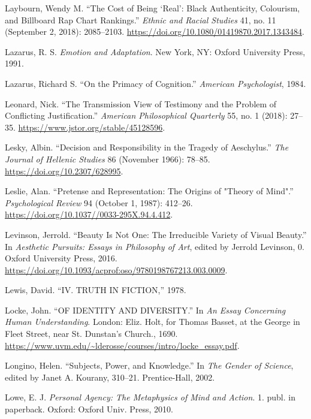 \documentclass[phdthesis,12pt,final]{wuthesis}
\newlength{\cslhangindent}
\newenvironment{CSLReferences}[2] %
{\begin{list}{}{%
	\setlength{\itemindent}{0pt}
	\setlength{\leftmargin}{0pt}
	\setlength{\parsep}{0pt}
	\ifodd #1
	\setlength{\leftmargin}{\cslhangindent}
	\setlength{\itemindent}{-1\cslhangindent}
	\fi
	\setlength{\itemsep}{#2\baselineskip}}}
{\end{list}}
\theoremstyle{definition}
\theoremstyle{definition}
\theoremstyle{definition}
\theoremstyle{definition}
\theoremstyle{remark}
\begin{document}
\begin{CSLReferences}{1}{0}
Laybourn, Wendy M. {``The Cost of Being {`Real'}: Black Authenticity, Colourism, and {Billboard Rap Chart} Rankings.''} \emph{Ethnic and Racial Studies} 41, no. 11 (September 2, 2018): 2085--2103. \url{https://doi.org/10.1080/01419870.2017.1343484}.

Lazarus, R. S. \emph{Emotion and Adaptation}. New York, NY: Oxford University Press, 1991.

Lazarus, Richard S. {``On the {Primacy} of {Cognition}.''} \emph{American Psychologist}, 1984.

Leonard, Nick. {``The {Transmission View} of {Testimony} and the {Problem} of {Conflicting Justification}.''} \emph{American Philosophical Quarterly} 55, no. 1 (2018): 27--35. \url{https://www.jstor.org/stable/45128596}.

Lesky, Albin. {``Decision and {Responsibility} in the {Tragedy} of {Aeschylus}.''} \emph{The Journal of Hellenic Studies} 86 (November 1966): 78--85. \url{https://doi.org/10.2307/628995}.

Leslie, Alan. {``Pretense and {Representation}: {The Origins} of "{Theory} of {Mind}".''} \emph{Psychological Review} 94 (October 1, 1987): 412--26. \url{https://doi.org/10.1037//0033-295X.94.4.412}.

Levinson, Jerrold. {``Beauty Is {Not One}: {The Irreducible Variety} of {Visual Beauty}.''} In \emph{Aesthetic {Pursuits}: {Essays} in {Philosophy} of {Art}}, edited by Jerrold Levinson, 0. Oxford University Press, 2016. \url{https://doi.org/10.1093/acprof:oso/9780198767213.003.0009}.

Lewis, David. {``{IV}. {TRUTH IN FICTION},''} 1978.

Locke, John. {``{OF IDENTITY AND DIVERSITY}.''} In \emph{An {Essay Concerning Human Understanding}}. London: Eliz. Holt, for Thomas Basset, at the George in Fleet Street, near St. Dunstan's Church., 1690. \url{https://www.uvm.edu/~lderosse/courses/intro/locke_essay.pdf}.

Longino, Helen. {``Subjects, {Power}, and {Knowledge}.''} In \emph{The {Gender} of {Science}}, edited by Janet A. Kourany, 310--21. Prentice-Hall, 2002.

Lowe, E. J. \emph{Personal Agency: The Metaphysics of Mind and Action}. 1. publ. in paperback. Oxford: Oxford Univ. Press, 2010.


\end{CSLReferences}
\end{document}
